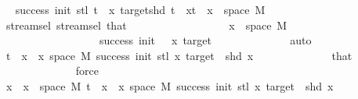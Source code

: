 \begin{isabellebody}
\ \isamarkupfalse%
\ {\isachardoublequoteopen}success\ {\isacharparenleft}{\kern0pt}init{\isacharplus}{\kern0pt}{}{\isacharparenright}{\kern0pt}\ {\isacharparenleft}{\kern0pt}stl\ {\isacharparenleft}{\kern0pt}t\ {\isacharhash}{\kern0pt}{\isacharhash}{\kern0pt}\ x{\isacharparenright}{\kern0pt}{\isacharparenright}{\kern0pt}\ target{\isachardoublequoteclose}{\isachardoublequoteopen}shd\ {\isacharparenleft}{\kern0pt}t\ {\isacharhash}{\kern0pt}{\isacharhash}{\kern0pt}\ x{\isacharparenright}{\kern0pt}{\isachardoublequoteclose}{\isachardoublequoteopen}{\isacharparenleft}{\kern0pt}t\ {\isacharhash}{\kern0pt}{\isacharhash}{\kern0pt}\ x{\isacharparenright}{\kern0pt}\ {\isasymin}\ space\ M{\isachardoublequoteclose}\isanewline
\ \ \ \ \ \ \ \ \ \ \ \ \isamarkupfalse%
\ stream{\isachardot}{\kern0pt}sel{\isacharparenleft}{\kern0pt}{}{\isacharparenright}{\kern0pt}\ stream{\isachardot}{\kern0pt}sel{\isacharparenleft}{\kern0pt}{}{\isacharparenright}{\kern0pt}\ that\isanewline
\ \ \ \ \ \ \ \ \ \ \ \ \ \ \ \ \ \ {\isacartoucheopen}x\ {\isasymin}\ space\ M{\isacartoucheclose}\isanewline
\ \ \ \ \ \ \ \ \ \ \ \ \ \ \ \ \ \ {\isacartoucheopen}success\ {\isacharparenleft}{\kern0pt}init\ {\isacharplus}{\kern0pt}\ {}{\isacharparenright}{\kern0pt}\ x\ target{\isacartoucheclose}\isanewline
\ \ \ \ \ \ \ \ \ \ \ \ \isamarkupfalse%
\ auto\isanewline
\ \ \ \ \ \ \ \ \ \ \isamarkupfalse%
\ \isamarkupfalse%
\ {\isachardoublequoteopen}t\ {\isacharhash}{\kern0pt}{\isacharhash}{\kern0pt}\ x\ {\isasymin}\ {\isacharbraceleft}{\kern0pt}x{\isasymin}\ space\ M{\isachardot}{\kern0pt}\ success\ {\isacharparenleft}{\kern0pt}init{\isacharplus}{\kern0pt}{}{\isacharparenright}{\kern0pt}\ {\isacharparenleft}{\kern0pt}stl\ x{\isacharparenright}{\kern0pt}\ target\ {\isasymand}\ shd\ x{\isacharbraceright}{\kern0pt}{\isachardoublequoteclose}\isanewline
\ \ \ \ \ \ \ \ \ \ \ \ \isamarkupfalse%
\ that\isanewline
\ \ \ \ \ \ \ \ \ \ \ \ \isamarkupfalse%
\ force\isanewline
\ \ \ \ \ \ \ \ \ \ \isamarkupfalse%
\ \isamarkupfalse%
\ {\isachardoublequoteopen}x\ {\isasymin}\ {\isacharbraceleft}{\kern0pt}x\ {\isasymin}\ space\ M{\isachardot}{\kern0pt}\ t\ {\isacharhash}{\kern0pt}{\isacharhash}{\kern0pt}\ x\ {\isasymin}\ {\isacharbraceleft}{\kern0pt}x{\isasymin}\ space\ M{\isachardot}{\kern0pt}\ success\ {\isacharparenleft}{\kern0pt}init{\isacharplus}{\kern0pt}{}{\isacharparenright}{\kern0pt}\ {\isacharparenleft}{\kern0pt}stl\ x{\isacharparenright}{\kern0pt}\ target\ {\isasymand}\ shd\ x{\isacharbraceright}{\kern0pt}{\isacharbraceright}{\kern0pt}{\isachardoublequoteclose}\isanewline

\end{isabellebody}
